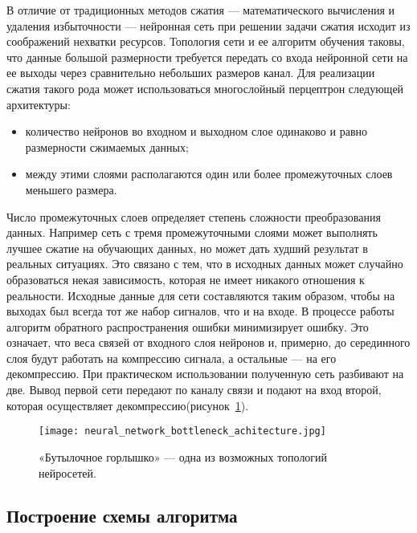 В отличие от традиционных методов сжатия --- математического вычисления и удаления избыточности --- нейронная сеть при
решении задачи сжатия исходит из соображений нехватки ресурсов. Топология сети и ее алгоритм обучения таковы,
что данные большой размерности требуется передать со входа нейронной сети на ее выходы через сравнительно небольших размеров канал.
Для реализации сжатия такого рода может использоваться многослойный перцептрон следующей архитектуры:
\begin{itemize}
  \item количество нейронов во входном и выходном слое одинаково и равно размерности сжимаемых данных;
  \item между этими слоями располагаются один или более промежуточных слоев меньшего размера.
\end{itemize}
Число промежуточных слоев определяет степень сложности преобразования данных. Например сеть с тремя промежуточными слоями
может выполнять лучшее сжатие на обучающих данных, но может дать худший результат в реальных ситуациях. Это связано с тем,
что в исходных данных может случайно образоваться некая зависимость, которая не имеет никакого отношения к реальности.
Исходные данные для сети составляются таким образом, чтобы на выходах был всегда тот же набор сигналов, что и на входе.
В процессе работы алгоритм обратного распространения ошибки минимизирует ошибку. Это означает, что веса связей от входного слоя нейронов и,
примерно, до серединного слоя будут работать на компрессию сигнала, а остальные --- на его декомпрессию.
При практическом использовании полученную сеть разбивают на две. Вывод первой сети передают по каналу связи и подают на вход второй,
которая осуществляет декомпрессию(рисунок~\ref{fig:bottleneck_achitecture}).

\begin{figure}[ht]
\centering
  \texttt{[image: neural\_network\_bottleneck\_achitecture.jpg]}
  \caption{ «Бутылочное горлышко» — одна из возможных топологий нейросетей. }
  \label{fig:bottleneck_achitecture}
\end{figure}

\subsection{Построение схемы алгоритма}
\label{sub:research:algorithm}

